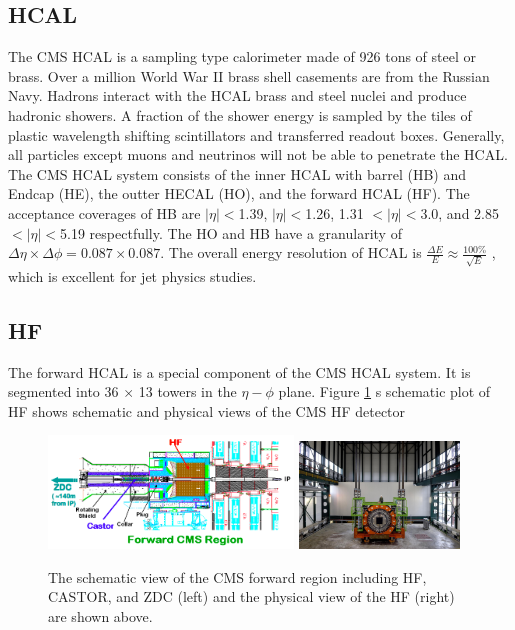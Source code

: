 \subsection{HCAL}

The CMS HCAL is a sampling type calorimeter made of 926 tons of steel or brass. Over a million World War II brass shell casements are from the Russian Navy. Hadrons interact with the HCAL brass and steel nuclei and produce hadronic showers. A fraction of the shower energy is sampled by the tiles of plastic wavelength shifting scintillators and transferred readout boxes. Generally, all particles except muons and neutrinos will not be able to penetrate the HCAL. The CMS HCAL system consists of the inner HCAL with barrel (HB) and Endcap (HE), the outter HECAL (HO), and the forward HCAL (HF). The acceptance coverages of HB are $|\eta| < $1.39, $|\eta| < $1.26, 1.31 $< |\eta| < $3.0, and 2.85 $< |\eta| < $5.19 respectfully. The HO and HB have a granularity of $\Delta \eta \times \Delta \phi = 0.087 \times 0.087$. The overall energy resolution of HCAL is $\frac{\Delta E}{E} \approx \frac{100\%}{\sqrt {E}}$ \cite{HCALReport}, which is excellent for jet physics studies.

\subsection{HF}

The forward HCAL is a special component of the CMS HCAL system. It is segmented into 36 $\times$ 13 towers in the $\eta - \phi$ plane. Figure \ref{HFPic} s schematic plot of HF shows schematic and physical views of the CMS HF detector \cite{HFInfo}

\begin{figure}[hbtp]
\begin{center}
\includegraphics[width=0.58\textwidth]{Figures/Chapter2/CMSForwardRegion.png}
\includegraphics[width=0.38\textwidth]{Figures/Chapter2/HFReal.jpg}
\caption{The schematic view of the CMS forward region including HF, CASTOR, and ZDC (left) and the physical view of the HF (right) are shown above.}
\label{HFPic}
\end{center}
\end{figure} 

